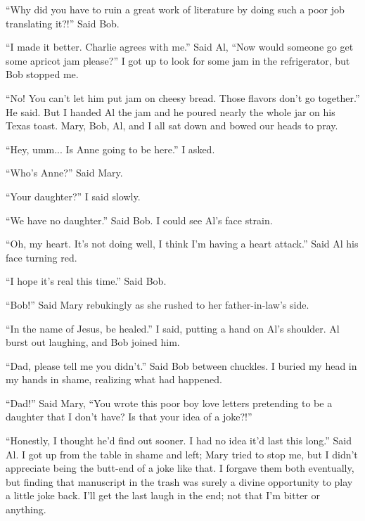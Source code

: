``Why did you have to ruin a great work of literature by doing such a poor job translating it?!'' Said Bob.

``I made it better. Charlie agrees with me.'' Said Al, ``Now would someone go get some apricot jam please?'' I got up to look for some jam in the refrigerator, but Bob stopped me.

``No! You can't let him put jam on cheesy bread. Those flavors don't go together.'' He said. But I handed Al the jam and he poured nearly the whole jar on his Texas toast. Mary, Bob, Al, and I all sat down and bowed our heads to pray.

``Hey, umm... Is Anne going to be here.'' I asked.

``Who's Anne?'' Said Mary.

``Your daughter?'' I said slowly.

``We have no daughter.'' Said Bob. I could see Al's face strain.

``Oh, my heart. It's not doing well, I think I'm having a heart attack.'' Said Al his face turning red.

``I hope it's real this time.'' Said Bob.

``Bob!'' Said Mary rebukingly as she rushed to her father-in-law's side.

``In the name of Jesus, be healed.'' I said, putting a hand on Al's shoulder. Al burst out laughing, and Bob joined him.

``Dad, please tell me you didn't.'' Said Bob between chuckles. I buried my head in my hands in shame, realizing what had happened.

``Dad!'' Said Mary, ``You wrote this poor boy love letters pretending to be a daughter that I don't have? Is that your idea of a joke?!''

``Honestly, I thought he'd find out sooner. I had no idea it'd last this long.'' Said Al. I got up from the table in shame and left; Mary tried to stop me, but I didn't appreciate being the butt-end of a joke like that. I forgave them both eventually, but finding that manuscript in the trash was surely a divine opportunity to play a little joke back. I'll get the last laugh in the end; not that I'm bitter or anything.
